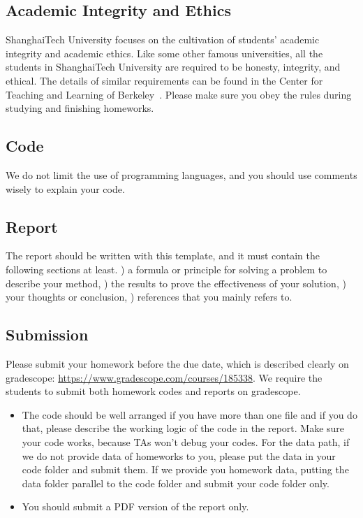 \documentclass[10pt,twocolumn,letterpaper]{article}
\begin{document}
\subsection{Academic Integrity and Ethics}
 ShanghaiTech University focuses on the cultivation of students' academic integrity and academic ethics.  Like some other famous universities, all the students in ShanghaiTech University are required to be honesty, integrity, and ethical. The details of similar requirements can be found in the Center for Teaching and Learning of Berkeley~\cite{rules}. Please make sure you obey the rules during studying and finishing homeworks.
 
 \subsection{Code}
 We do not limit the use of programming languages, and you should use comments wisely to explain your code.
 
 \subsection{Report}
 The report should be written with this template, and it must contain the following sections at least. ) a formula or principle for solving a problem to describe your method, ) the results to prove the effectiveness of your solution, ) your thoughts or conclusion, ) references that you mainly refers to.
 
\subsection{Submission}
Please submit your homework before the due date, which is described clearly on gradescope: \url{https://www.gradescope.com/courses/185338}. We require the students to submit both homework codes and reports on gradescope.
 \begin{itemize}
\item The code should be well arranged if you have more than one file and if you do that, please describe the working logic of the code in the report. Make sure your code works, because TAs won't debug your codes. For the data path, if we do not provide data of homeworks to you, please put the data in your code folder and submit them. If we provide you homework data, putting the data folder parallel to the code folder and submit your code folder only. 
 \end{itemize}
\begin{itemize}
\item You should submit a PDF version of the report only.
\end{itemize}
\end{document}
